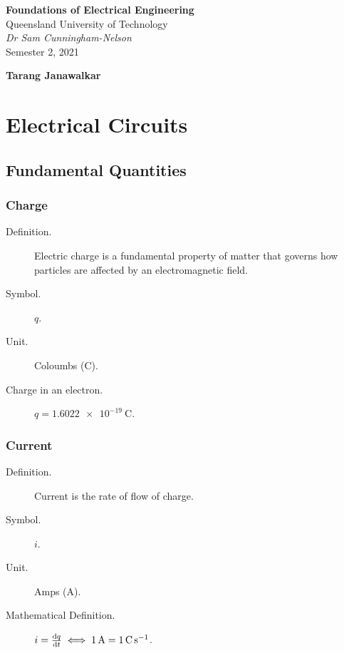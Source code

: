 \documentclass{article}
\date{}
\newcommand{\uniTitle}{Queensland University of Technology}
\newcommand{\className}{Foundations of Electrical Engineering}
\newcommand{\classTime}{Semester 2, 2021}
\newcommand{\classInstructorName}{Dr Sam Cunningham-Nelson}
\newcommand{\authorName}{Tarang Janawalkar}
\begin{document}
\begin{titlepage}
    \vspace*{\fill}
	\begin{center}
        \LARGE
        \textbf{\className}
        \texorpdfstring{\\}{ }
        \uniTitle
        \texorpdfstring{\\}{ }
        \texorpdfstring{\vspace{0.3in}}{ }
        \normalsize\textit{\classInstructorName}
        \texorpdfstring{\\}{ }
        \classTime
    \end{center}
    \begin{center}
        \textbf{\authorName}
    \end{center}
    \vspace*{\fill}
    \doclicenseThis
    \thispagestyle{empty}
\end{titlepage}
\newpage

\tableofcontents
\newpage

\section{Electrical Circuits}
\subsection{Fundamental Quantities}
\subsubsection{Charge}
\begin{description}
    \item[Definition.] Electric charge is a fundamental property of matter that governs how particles are affected by an electromagnetic field.
    \item[Symbol.] $q$.
    \item[Unit.] Coloumbs (\unit{\coulomb}).
    \item[Charge in an electron.] $q=\SI{1.6022e-19}{\coulomb}$. 
\end{description}
\subsubsection{Current}
\begin{description}
    \item[Definition.] Current is the rate of flow of charge.
    \item[Symbol.] $i$.
    \item[Unit.] Amps (\unit{\ampere}).
    \item[Mathematical Definition.] $i=\dv{q}{t}\iff\SI{1}{\ampere}=\SI{1}{\coulomb\per\s}$. 
\end{description}
\end{document}
